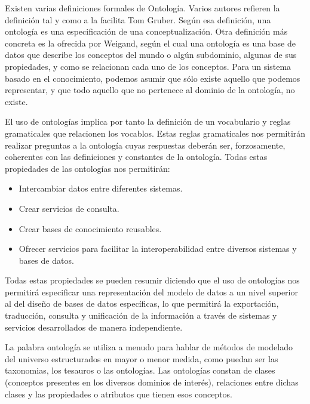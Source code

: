 		Existen varias definiciones formales de Ontología. Varios autores refieren la definición tal y como a la facilita Tom Gruber\cite{GRUBER:93}. Según esa definición, una ontología es una especificación de una conceptualización. Otra definición más concreta es la ofrecida por Weigand\cite{WEIGAND:97}, según el cual una ontología es una base de datos que describe los conceptos del mundo o algún subdominio, algunas de sus propiedades, y como se relacionan cada uno de los conceptos. Para un sistema basado en el conocimiento, podemos asumir que sólo existe aquello que podemos representar, y que todo aquello que no pertenece al dominio de la ontología, no existe. 

		El uso de ontologías implica por tanto la definición de un vocabulario y reglas gramaticales que relacionen los vocablos. Estas reglas gramaticales nos permitirán realizar preguntas a la ontología cuyas respuestas deberán ser, forzosamente, coherentes con las definiciones y constantes de la ontología. Todas estas propiedades de las ontologías nos permitirán:

		\begin{itemize}
			\item Intercambiar datos entre diferentes sistemas.

			\item Crear servicios de consulta.
			
			\item Crear bases de conocimiento reusables.

			\item Ofrecer servicios para facilitar la interoperabilidad entre diversos sistemas y bases de datos.

		\end{itemize}
      
		Todas estas propiedades se pueden resumir diciendo que el uso de ontologías nos permitirá especificar una representación del modelo de datos a un nivel superior al del diseño de bases de datos específicas, lo que permitirá la exportación, traducción, consulta y unificación de la información a través de sistemas y servicios desarrollados de manera independiente.
      
		La palabra ontología se utiliza a menudo para hablar de métodos de modelado del universo estructurados en mayor o menor medida, como puedan ser las taxonomias, los tesauros o las ontologías. Las ontologías constan de clases (conceptos presentes en los diversos dominios de interés), relaciones entre dichas clases y las propiedades o atributos que tienen esos conceptos.
      
